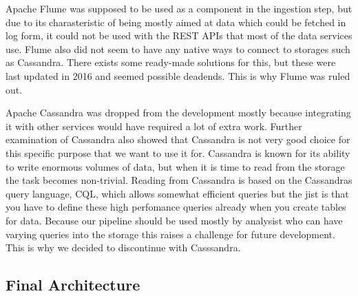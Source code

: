Apache Flume was supposed to be used as a component in the ingestion step, but due to its charasteristic of being mostly aimed at data which could be fetched in log form, it could not be used with the REST APIs that most of the data services use.
Flume also did not seem to have any native ways to connect to storages such as Cassandra.
There exists some ready-made solutions for this, but these were last updated in 2016 and seemed possible deadends.
This is why Flume was ruled out.

Apache Cassandra was dropped from the development mostly because integrating it with other services would have required a lot of extra work. 
Further examination of Cassandra also showed that Cassandra is not very good choice for this specific purpose that we want to use it for.
Cassandra is known for its ability to write enormous volumes of data, but when it is time to read from the storage the task becomes non-trivial.
Reading from Cassandra is based on the Cassandras query language, CQL, which allows somewhat efficient queries but the jist is that you have to define these high perfomance queries already when you create tables for data. \cite{dronavalli}
Because our pipeline should be used mostly by analysist who can have varying queries into the storage this raises a challenge for future development.
This is why we decided to discontinue with Casssandra.

\subsection{Final Architecture}

